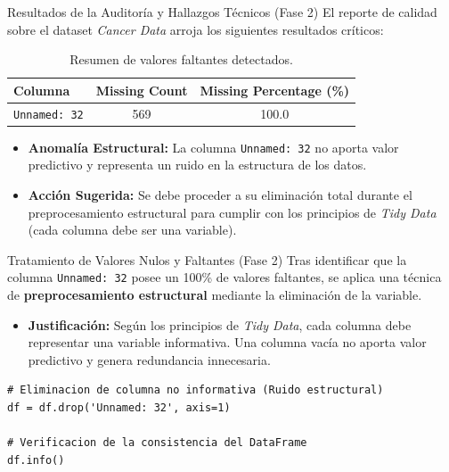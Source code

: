 \documentclass{beamer}
\begin{document}
	\begin{frame}{Resultados de la Auditoría y Hallazgos Técnicos (Fase 2)}
		El reporte de calidad sobre el dataset \textit{Cancer Data} arroja los siguientes resultados críticos:
		
		\begin{table}
			\centering
			\begin{tabular}{|l|c|c|}
				\hline
				\textbf{Columna} & \textbf{Missing Count} & \textbf{Missing Percentage (\%)} \\ \hline
				\texttt{Unnamed: 32} & 569 & 100.0 \\ \hline
			\end{tabular}
			\caption{Resumen de valores faltantes detectados.}
		\end{table}
		
		\begin{itemize}
			\item<3-> \textbf{Anomalía Estructural:} La columna \texttt{Unnamed: 32} no aporta valor predictivo y representa un ruido en la estructura de los datos.
			\item<4-> \textbf{Acción Sugerida:} Se debe proceder a su eliminación total durante el preprocesamiento estructural para cumplir con los principios de \textit{Tidy Data} (cada columna debe ser una variable).
		\end{itemize}
	\end{frame}
	
	\begin{frame}[fragile]{Tratamiento de Valores Nulos y Faltantes (Fase 2)}
		Tras identificar que la columna \texttt{Unnamed: 32} posee un 100\% de valores faltantes, se aplica una técnica de \textbf{preprocesamiento estructural} mediante la eliminación de la variable.
		
		\begin{itemize}
			\item \textbf{Justificación:} Según los principios de \textit{Tidy Data}, cada columna debe representar una variable informativa. Una columna vacía no aporta valor predictivo y genera redundancia innecesaria.
		\end{itemize}
		
		\begin{lstlisting}[style=colab]
# Eliminacion de columna no informativa (Ruido estructural)
df = df.drop('Unnamed: 32', axis=1)

# Verificacion de la consistencia del DataFrame
df.info()
		\end{lstlisting}
	\end{frame}
	
\end{document}
